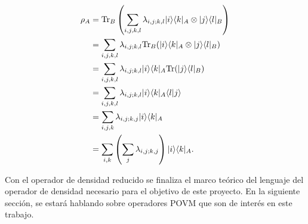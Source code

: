\begin{equation}
	\begin{split}
		\rho_A&={\rm Tr}_B\left(\sum_{i,j,k,l}\lambda_{i,j;k,l} |i\rangle \langle k|_A\otimes|j\rangle \langle l|_B\right)\\
		&=\sum_{i,j,k,l}\lambda_{i,j;k,l} {\rm Tr}_B(|i\rangle \langle k|_A\otimes|j\rangle \langle l|_B)\\
		&=\sum_{i,j,k,l}\lambda_{i,j;k,l}|i\rangle \langle k|_A {\rm Tr}(|j\rangle \langle l|_B)\\
		&=\sum_{i,j,k,l}\lambda_{i,j;k,l}|i\rangle \langle k|_A \langle l|j\rangle \\
		&=\sum_{i,j,k}\lambda_{i,j;k,j}|i\rangle \langle k|_A\\
		&=\sum_{i,k}\left(\sum_j\lambda_{i,j;k,j}\right)|i\rangle \langle k|_A.
	\end{split}
\end{equation}



Con el operador de densidad reducido se finaliza el marco teórico del lenguaje del operador de densidad necesario para el objetivo de este proyecto. En la siguiente sección, se estará hablando sobre operadores POVM que son de interés en este trabajo.



